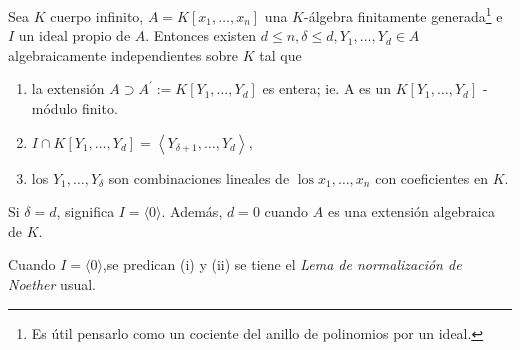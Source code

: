 \documentclass[../main.tex]{subfiles}
\begin{document}
\begin{theorem}
Sea $K$ cuerpo infinito, $A=K\left[x_{1}, \ldots, x_{n}\right]$ una $K$-álgebra finitamente generada\footnote{Es útil pensarlo como un cociente del anillo de polinomios por un ideal.} e $I$ un ideal propio de $A$. Entonces existen $d \leq n, \delta \leq d, Y_{1}, \ldots, Y_{d} \in A$ algebraicamente independientes
sobre $K$ tal que
\begin{enumerate}
  \item la extensión $A \supset A^{\prime}:=K\left[Y_{1}, \ldots, Y_{d}\right]$ es entera; ie. A es un $K\left[Y_{1}, \ldots, Y_{d}\right]$ -módulo finito.
  \item $I \cap K[Y_{1}, \ldots, Y_{d}]=\left\langle Y_{\delta+1}, \ldots, Y_{d}\right\rangle$,
  \item los $Y_{1}, \ldots, Y_{\delta}$ son combinaciones lineales de $\operatorname{los} x_{1}, \ldots, x_{n}$ con coeficientes en $K$.
\end{enumerate}
\end{theorem}

\begin{remark}
Si $\delta=d$, significa $I=\langle 0\rangle$. Además, $d=0$ cuando $A$ es una extensión algebraica de $K$.
\end{remark}

\begin{remark}
Cuando $I=\langle 0\rangle$,se predican (i) y (ii) se tiene el \emph{Lema de normalización de Noether} usual.
\end{remark}
\end{document}
